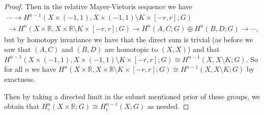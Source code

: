 \documentclass[11pt]{article}
\begin{document}
\begin{enumerate}
\begin{proof}
      Then in the relative Mayer-Vietoris sequence we have \begin{multline*}
        \cdots \to H^{n-1}(X\times(-1,1),X\times(-1,1)\setminus K\times[-r,r];G)\\\to H^n(X\times \mathbb{R},X\times \mathbb{R}\setminus K\times[-r,r];G)\to H^n(A,C;G)\oplus H^n(B,D;G)\to \cdots,
      \end{multline*} but by homotopy invariance we have that the direct sum is trivial (as before we saw that $(A,C)$ and $(B,D)$ are homotopic to $(X,X)$) and that $H^{n-1}(X\times(-1,1),X\times(-1,1)\setminus K\times[-r,r];G)\cong H^{n-1}(X,X\setminus K;G)$. So for all $n$ we have $H^n(X\times \mathbb{R},X\times \mathbb{R}\setminus K\times[-r,r];G)\cong H^{n-1}(X,X\setminus K;G)$ by exactness.
      
      Then by taking a directed limit in the subnet mentioned prior of these groups, we obtain that $H^n_c(X\times\mathbb{R};G)\cong H^{n-1}_c(X;G)$ as needed.
    \end{proof}
\end{enumerate}
\end{document}
